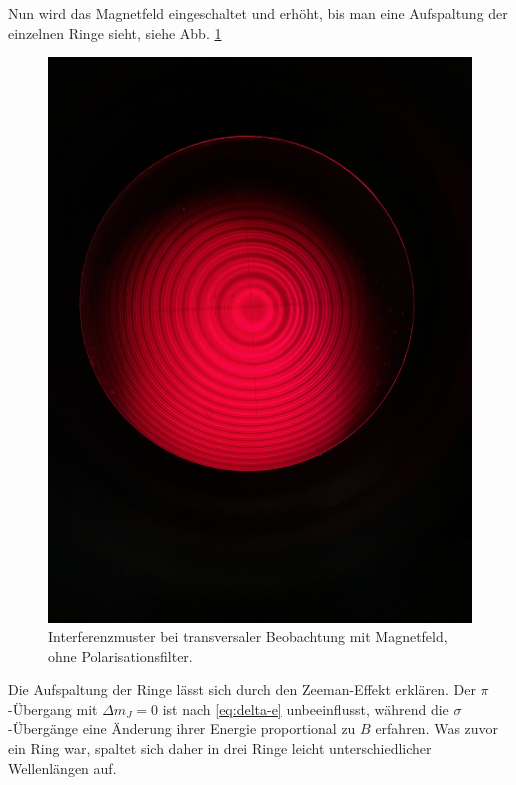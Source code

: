 \documentclass{article}
\begin{document}
\begin{multicols}{2}
Nun wird das Magnetfeld eingeschaltet und erhöht, bis man eine Aufspaltung der einzelnen Ringe sieht, siehe Abb. \ref{fig:zeeman-transveral-mit-ohne}
\begin{figure}[H]
  \centering
  \includegraphics[width=.8\linewidth]{zeeman-transversal-mit-ohne}
  \caption{Interferenzmuster bei transversaler Beobachtung mit Magnetfeld, ohne Polarisationsfilter.}
  \label{fig:zeeman-transveral-mit-ohne}
\end{figure}
Die Aufspaltung der Ringe lässt sich durch den Zeeman-Effekt erklären. Der $\pi$-Übergang mit $\Delta m_J=0$ ist nach \eqref{eq:delta-e}
unbeeinflusst, während die $\sigma$-Übergänge eine Änderung ihrer Energie proportional zu $B$ erfahren.
Was zuvor ein Ring war, spaltet sich daher in drei Ringe leicht unterschiedlicher Wellenlängen auf.


\end{multicols}
\end{document}
